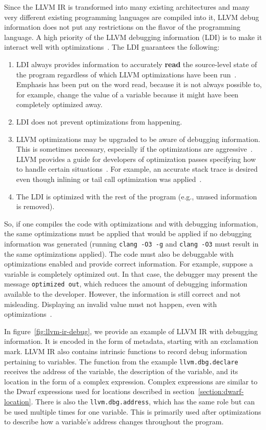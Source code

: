 Since the LLVM IR is transformed into many existing architectures and many very
different existing programming languages are compiled into it, LLVM debug
information does not put any restrictions on the flavor of the programming
language. A high priority of the LLVM debugging information (LDI) is to make it
interact well with optimizations~\cite{llvm-debug-info}. The LDI guarantees the
following:
\begin{enumerate}
    \item LDI always provides information to accurately \textbf{read} the
        source-level state of the program regardless of which LLVM
        optimizations have been run~\cite{llvm-debug-info}. Emphasis has been
        put on the word read, because it is not always possible to, for
        example, change the value of a variable because it might have been
        completely optimized away.
    \item LDI does not prevent optimizations from happening.
    \item LLVM optimizations may be upgraded to be aware of debugging
        information. This is sometimes necessary, especially if the
        optimizations are aggressive~\cite{llvm-debug-info}. LLVM provides a
        guide for developers of optimization passes specifying how to handle
        certain situations~\cite{llvm-debug-optimizations}. For example,
        an accurate stack trace is desired even though inlining or tail call
        optimization was applied~\cite{llvm-debug-info}.
    \item The LDI is optimized with the rest of the program (e.g., unused
        information is removed).
\end{enumerate}
So, if one compiles the code with optimizations and with debugging information,
the same optimizations must be applied that would be applied if no debugging
information was generated (running \texttt{clang -O3 -g} and \texttt{clang -O3}
must result in the same optimizations applied). The code must also be
debuggable with optimizations enabled and provide correct information. For
example, suppose a variable is completely optimized out. In that case, the
debugger may present the message \texttt{optimized out}, which reduces the
amount of debugging information available to the developer. However, the
information is still correct and not misleading. Displaying an invalid value
must not happen, even with optimizations~\cite{llvm-debug-info}.

In figure~\ref{fig:llvm-ir-debug}, we provide an example of LLVM IR with
debugging information. It is encoded in the form of metadata, starting with an
exclamation mark. LLVM IR also contains intrinsic functions to record debug
information pertaining to variables. The function from the example
\texttt{llvm.dbg.declare} receives the address of the variable, the description
of the variable, and its location in the form of a complex expression. Complex
expressions are similar to the Dwarf expressions used for locations described
in section~\ref{section:dwarf-location}. There is also the
\texttt{llvm.dbg.address}, which has the same role but can be used multiple
times for one variable. This is primarily used after optimizations to describe
how a variable's address changes throughout the program.

